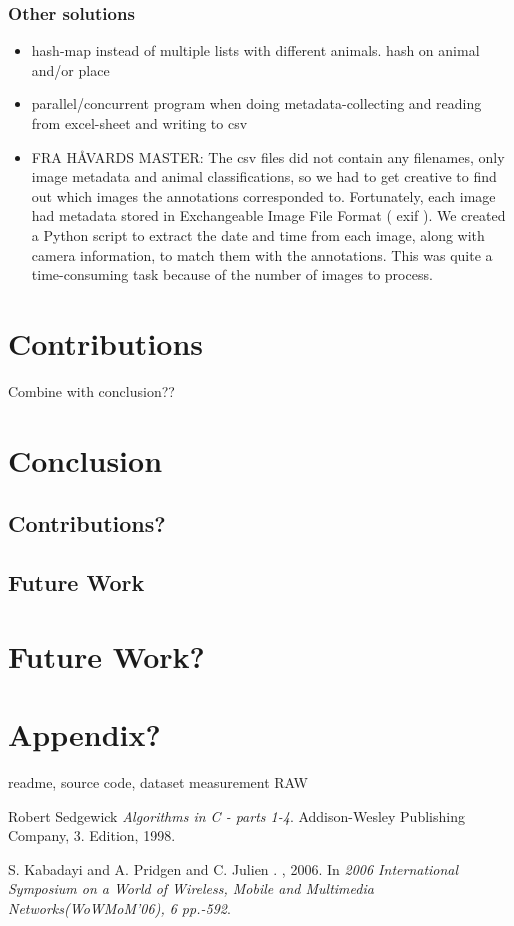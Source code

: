 \documentclass[USenglish]{uit-thesis}
\begin{document}
\subsection{Other solutions}
\begin{itemize}
\item hash-map instead of multiple lists with different animals. hash on animal and/or place
\item parallel/concurrent program when doing metadata-collecting and reading from excel-sheet and writing to csv
\item FRA HÅVARDS MASTER: The csv files did not contain any filenames,
only image metadata and animal classifications, so we had to get creative
to find out which images the annotations corresponded to. Fortunately, each
image had metadata stored in Exchangeable Image File Format ( exif ). We
created a Python script to extract the date and time from each image, along
with camera information, to match them with the annotations. This was quite
a time-consuming task because of the number of images to process.
\end{itemize}



\chapter{Contributions}
Combine with conclusion??
\chapter{Conclusion}
\section{Contributions?}
\section{Future Work}

\chapter{Future Work?}

\chapter{Appendix?}
readme, source code, dataset measurement RAW
\backmatter



\newpage{}

\begin{thebibliography}{9}

 Robert Sedgewick 
  \emph{Algorithms in C - parts 1-4}.
  Addison-Wesley Publishing Company,
  3. Edition,
  1998.

S. Kabadayi and A. Pridgen and C. Julien
.
\newblock , 2006.
\newblock In {\em 2006 International Symposium on a World of Wireless, Mobile and Multimedia Networks(WoWMoM'06), 6 pp.-592}.



\end{thebibliography}
\end{document}
